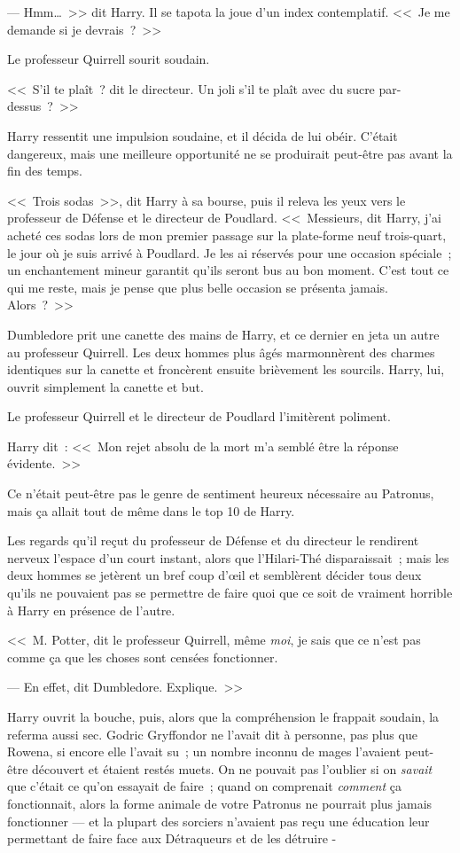 --- Hmm…~>> dit Harry. Il se tapota la joue d'un index contemplatif. <<~Je me demande si je devrais~?~>>

Le professeur Quirrell sourit soudain.

<<~S'il te plaît~? dit le directeur. Un joli s'il te plaît avec du sucre par-dessus~?~>>

Harry ressentit une impulsion soudaine, et il décida de lui obéir. C'était dangereux, mais une meilleure opportunité ne se produirait peut-être pas avant la fin des temps.

<<~Trois sodas~>>, dit Harry à sa bourse, puis il releva les yeux vers le professeur de Défense et le directeur de Poudlard. <<~Messieurs, dit Harry, j'ai acheté ces sodas lors de mon premier passage sur la plate-forme neuf trois-quart, le jour où je suis arrivé à Poudlard. Je les ai réservés pour une occasion spéciale~; un enchantement mineur garantit qu'ils seront bus au bon moment. C'est tout ce qui me reste, mais je pense que plus belle occasion se présenta jamais. Alors~?~>>

Dumbledore prit une canette des mains de Harry, et ce dernier en jeta un autre au professeur Quirrell. Les deux hommes plus âgés marmonnèrent des charmes identiques sur la canette et froncèrent ensuite brièvement les sourcils. Harry, lui, ouvrit simplement la canette et but.

Le professeur Quirrell et le directeur de Poudlard l'imitèrent poliment.

Harry dit~: <<~Mon rejet absolu de la mort m'a semblé être la réponse évidente.~>>

Ce n'était peut-être pas le genre de sentiment heureux nécessaire au Patronus, mais ça allait tout de même dans le top 10 de Harry.

Les regards qu'il reçut du professeur de Défense et du directeur le rendirent nerveux l'espace d'un court instant, alors que l'Hilari-Thé disparaissait~; mais les deux hommes se jetèrent un bref coup d'œil et semblèrent décider tous deux qu'ils ne pouvaient pas se permettre de faire quoi que ce soit de vraiment horrible à Harry en présence de l'autre.

<<~M. Potter, dit le professeur Quirrell, même \emph{moi}, je sais que ce n'est pas comme ça que les choses sont censées fonctionner.

--- En effet, dit Dumbledore. Explique.~>>

Harry ouvrit la bouche, puis, alors que la compréhension le frappait soudain, la referma aussi sec. Godric Gryffondor ne l'avait dit à personne, pas plus que Rowena, si encore elle l'avait su~; un nombre inconnu de mages l'avaient peut-être découvert et étaient restés muets. On ne pouvait pas l'oublier si on \emph{savait} que c'était ce qu'on essayait de faire~; quand on comprenait \emph{comment} ça fonctionnait, alors la forme animale de votre Patronus ne pourrait plus jamais fonctionner — et la plupart des sorciers n'avaient pas reçu une éducation leur permettant de faire face aux Détraqueurs et de les détruire -

